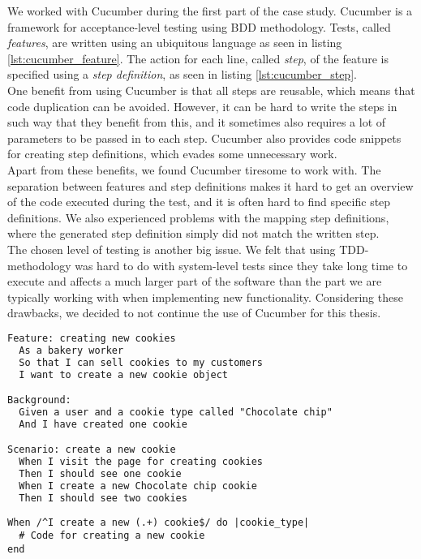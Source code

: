
We worked with Cucumber during the first part of the case study.
Cucumber is a framework for acceptance-level testing using BDD
methodology. Tests, called \emph{features}, are written using an
ubiquitous language as seen in listing \ref{lst:cucumber_feature}. The
action for each line, called \emph{step}, of the feature is specified
using a \emph{step definition}, as seen in listing
\ref{lst:cucumber_step}.\\

One benefit from using Cucumber is that all steps are reusable, which
means that code duplication can be avoided. However, it can be hard to
write the steps in such way that they benefit from this, and it
sometimes also requires a lot of parameters to be passed in to each
step. Cucumber also provides code snippets for creating step
definitions, which evades some unnecessary work.\\

Apart from these benefits, we found Cucumber tiresome to work with. The
separation between features and step definitions makes it hard to get an
overview of the code executed during the test, and it is often hard to
find specific step definitions. We also experienced problems with the
mapping step definitions, where the generated step definition simply did
not match the written step.\\

The chosen level of testing is another big issue. We felt that using
TDD-methodology was hard to do with system-level tests since they take
long time to execute and affects a much larger part of the software than
the part we are typically working with when implementing new
functionality. Considering these drawbacks, we decided to not continue
the use of Cucumber for this thesis.\\


\begin{lstlisting}[caption=Example of a Cucumber test.,
                   label=lst:cucumber_feature, float=t, language=HTML]
Feature: creating new cookies
  As a bakery worker
  So that I can sell cookies to my customers
  I want to create a new cookie object

Background:
  Given a user and a cookie type called "Chocolate chip"
  And I have created one cookie

Scenario: create a new cookie
  When I visit the page for creating cookies
  Then I should see one cookie
  When I create a new Chocolate chip cookie
  Then I should see two cookies
\end{lstlisting}


\begin{lstlisting}[caption=Cucumber step definition for the step on row 13 in code listing \ref{lst:cucumber_feature}.,
                   label=lst:cucumber_step, float=t]
When /^I create a new (.+) cookie$/ do |cookie_type|
  # Code for creating a new cookie
end
\end{lstlisting}
